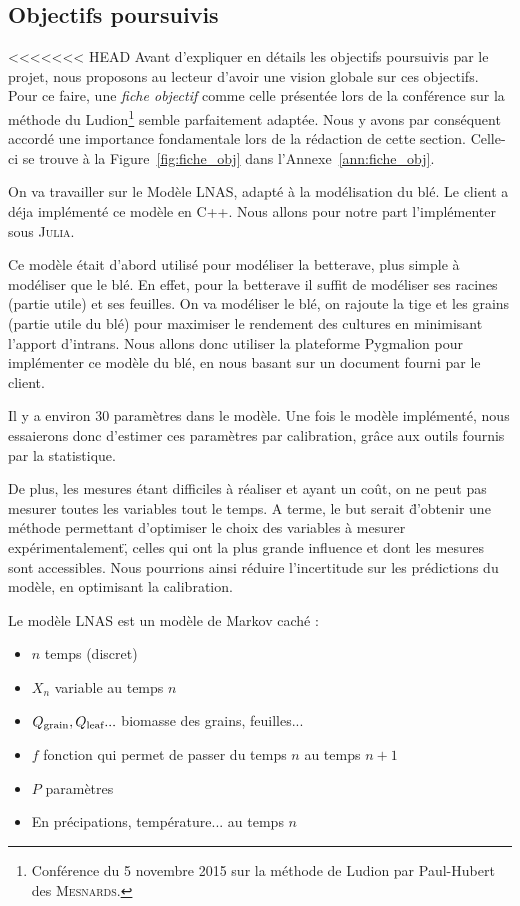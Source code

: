 \subsection{Objectifs poursuivis}
<<<<<<< HEAD
Avant d'expliquer en détails les objectifs poursuivis par le projet,
nous proposons au lecteur d'avoir une vision globale sur ces objectifs.
Pour ce faire, une \emph{fiche objectif} comme celle présentée 
lors de la conférence sur 
la méthode du Ludion\footnote{Conférence du 5 novembre 2015 
sur la méthode de Ludion par Paul-Hubert des \textsc{Mesnards}.} 
semble parfaitement adaptée.
Nous y avons par conséquent accordé une importance fondamentale
lors de la rédaction de cette section.
Celle-ci se trouve à la Figure~\ref{fig:fiche_obj} 
dans l'Annexe~\ref{ann:fiche_obj}.


On va travailler sur le Modèle LNAS, adapté à la modélisation du blé. 
Le client a déja implémenté ce modèle en C++. 
Nous allons pour notre part l'implémenter sous \textsc{Julia}.

Ce modèle était d'abord utilisé pour modéliser la betterave, 
plus simple à modéliser que le blé. 
En effet, pour la betterave il suffit de modéliser 
ses racines (partie utile) et ses feuilles.
On va modéliser le blé, on rajoute la tige et les grains (partie utile du blé)
pour maximiser le rendement des cultures en minimisant l’apport d’intrans.
Nous allons donc utiliser la plateforme Pygmalion 
pour implémenter ce modèle du blé,
en nous basant sur un document fourni par le client.

Il y a environ 30 paramètres dans le modèle. Une fois le modèle implémenté, nous essaierons donc d'estimer ces paramètres par calibration, grâce aux outils fournis par la statistique.

De plus, les mesures étant difficiles à réaliser et ayant un coût, on ne peut pas mesurer toutes les variables tout le temps. A terme, le but serait \"d'obtenir une méthode permettant d'optimiser le choix des variables à mesurer expérimentalement\", celles qui ont la plus grande influence et dont les mesures sont accessibles. Nous pourrions ainsi réduire l'incertitude sur les prédictions du modèle, en optimisant la calibration.

Le modèle LNAS est un modèle de Markov caché : 
\begin{itemize}
  \item $n$  temps (discret)     
  \item $X_n$ variable au temps $n$       
  \item $Q_{\text{grain}}, Q_{\text{leaf}}... $ biomasse des grains, feuilles...      
  \item $f$ fonction qui permet de passer du temps $n$ au temps $n+1$     
  \item $P$ paramètres      
  \item En précipations, température... au temps $n$
\end{itemize}

